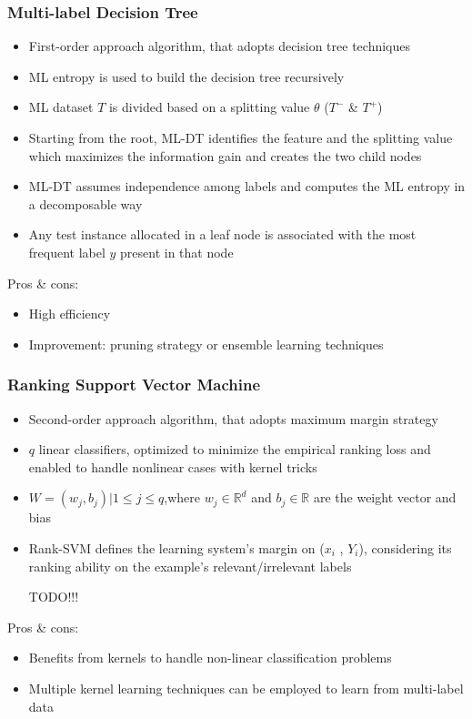 \documentclass{beamer}
\begin{document}
\begin{frame}
\frametitle{Multi-label Decision Tree}
\begin{itemize}
	\item First-order approach algorithm, that adopts decision tree techniques
	\item ML entropy is used to
build the decision tree recursively
	\item ML dataset $T$ is divided based on a splitting value $\theta$ ($T^-$ \& $T^+$)
	\item Starting from the root, ML-DT identifies the feature and the splitting value which
maximizes the information gain and creates the two child nodes
	\item ML-DT assumes independence among labels and computes the ML
entropy in a decomposable way
	\item Any test instance allocated in a leaf node is associated with the most frequent label $y$ present in that node
\end{itemize}
Pros \& cons:
\begin{itemize}
	\item High efficiency
	\item Improvement: pruning strategy  or ensemble learning techniques
\end{itemize}
\end{frame}
\begin{frame}
\frametitle{Ranking Support Vector Machine}
\begin{itemize}
	\item Second-order approach algorithm, that adopts maximum margin strategy 
	\item $q$ linear classifiers, optimized to minimize the empirical
ranking loss and enabled to handle nonlinear cases with kernel tricks 
	\item $W = {(w_j , b_j ) | 1 ≤ j ≤ q}$,where $w_j \in \mathbb{R}^d$ and
$b_j \in \mathbb{R}$ are the weight vector and bias
	\item Rank-SVM defines the learning system's
margin on ($x_i$ , $Y_i$), considering its ranking ability on the example’s relevant/irrelevant labels

TODO!!!
\end{itemize}
Pros \& cons:
\begin{itemize}
	\item Benefits from kernels to handle non-linear classification problems
	\item Multiple kernel learning techniques can be
employed to learn from multi-label data
\end{itemize}

\end{frame}
\end{document}
